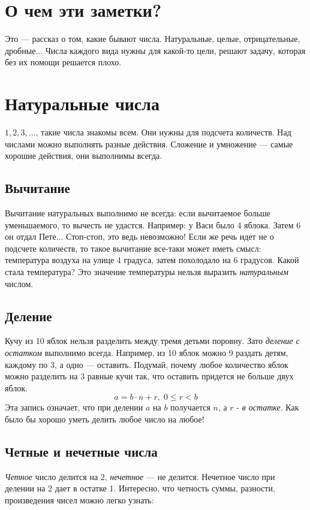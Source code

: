 \documentclass[a4paper,12pt]{article}
\begin{document}
    \section{О чем эти заметки?}
    Это --- рассказ о том, какие бывают числа. Натуральные, целые, отри\-ца\-тель\-ные, дробные... Числа каждого вида нужны для какой-то цели, решают задачу,
    которая без их помощи решается плохо.

    \section{Натуральные числа}
    $1, 2, 3, \ldots$, такие числа знакомы всем. Они нужны для подсчета количеств.
    Над числами можно выполнять
    разные действия. Сложение и умножение --- самые хорошие действия,
    они выполнимы всегда. 
    
    \subsection{Вычитание}
    Вычитание натуральных выполнимо не всегда: если вычитаемое больше 
    уменьшаемого, то вычесть не удастся. Например: у Васи было 4 яблока. 
    Затем 6 он отдал Пете... Стоп-стоп, это ведь невозможно!
    Если же речь идет не о подсчете количеств, то такое вычитание 
    все-таки может иметь смысл: температура воздуха на улице
    4 градуса, затем похолодало на 6 градусов. Какой стала
    температура? Это значение температуры нельзя выразить \emph{натуральным}
    числом.

    \subsection{Деление}
    Кучу из 10 яблок нельзя разделить между тремя детьми поровну.
    Зато \emph{деление с остатком} выполнимо всегда. Например,
    из 10 яблок можно 9 раздать детям, каждому по 3, а 
    одно --- оставить. Подумай, почему любое количество яблок 
    можно разделить на 3 равные кучи так, что оставить придется не 
    больше двух яблок.
    \[
    a = b\cdot n + r, \; 0 \leqslant r < b 
    \]   
    Эта запись означает, что при делении $a$ на $b$ получается $n$, а 
    $r$ - \emph{в остатке}.
    Как было бы хорошо уметь делить любое число на любое!
    
    \subsection{Четные и нечетные числа}
    \emph{Четное} число делится на 2, \emph{нечетное} --- не делится. Нечетное число 
    при делении на 2 дает в остатке 1. Интересно, что четность суммы, разности,
    произведения чисел можно легко узнать:
\end{document}
